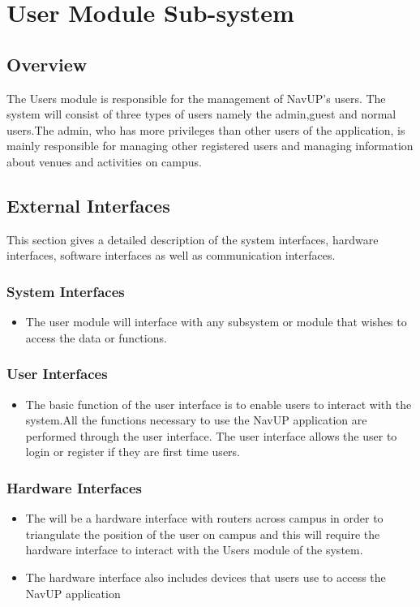 

\section{User Module Sub-system}
\subsection{Overview}
The Users module is responsible for the management of NavUP's users. The system will consist of three types of users namely the admin,guest and normal users.The admin, who has more privileges than other users of the application, is mainly responsible for managing other registered users and managing information about venues and activities on campus.

\subsection{External Interfaces}
This section gives a detailed description of the system interfaces, hardware interfaces, software interfaces as well as communication interfaces.

	\subsubsection{System Interfaces}
		\begin{itemize}
			\item The user module will interface with any subsystem or module that wishes to access the data or               functions. 
		
		\end{itemize}
	\subsubsection{User Interfaces }
	\begin{itemize}

	\item The basic function of the user interface is to enable users to interact with the system.All the functions necessary to use the NavUP application are performed through the user interface. The user interface allows the user to login or register if they are first time users. 
 \end{itemize}
 
	\subsubsection{Hardware Interfaces }
	\begin{itemize}
	\item The will be a hardware interface with routers across campus in order to triangulate the position of the user on campus and this will require the hardware interface to interact with the Users module of the system. 
	\item The hardware interface also includes devices that users use to access the NavUP application 
	\end{itemize}

